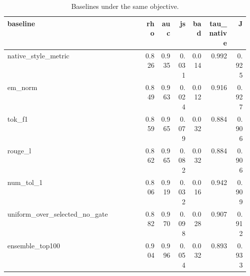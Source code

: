 \begin{table}[htbp]
\centering\tiny
\caption{Baselines under the same objective.}
\label{tab:baselines}
\setlength{\tabcolsep}{3pt}
\begin{tabular}{p{0.572\linewidth}rrrrrr}
\toprule
baseline & rho & auc & js & bad & tau\_\allowbreak{}native & J \\
\midrule
native\_\allowbreak{}style\_\allowbreak{}metric & 0.826 & 0.935 & 0.031 & 0.014 & 0.992 & 0.925 \\
em\_\allowbreak{}norm & 0.849 & 0.963 & 0.024 & 0.012 & 0.916 & 0.927 \\
tok\_\allowbreak{}f1 & 0.859 & 0.965 & 0.079 & 0.032 & 0.884 & 0.906 \\
rouge\_\allowbreak{}l & 0.862 & 0.965 & 0.082 & 0.032 & 0.884 & 0.906 \\
num\_\allowbreak{}tol\_\allowbreak{}1 & 0.806 & 0.919 & 0.032 & 0.016 & 0.942 & 0.909 \\
uniform\_\allowbreak{}over\_\allowbreak{}selected\_\allowbreak{}no\_\allowbreak{}gate & 0.882 & 0.970 & 0.098 & 0.028 & 0.907 & 0.912 \\
ensemble\_\allowbreak{}top100 & 0.904 & 0.996 & 0.054 & 0.032 & 0.893 & 0.933 \\
\bottomrule
\end{tabular}
\end{table}
